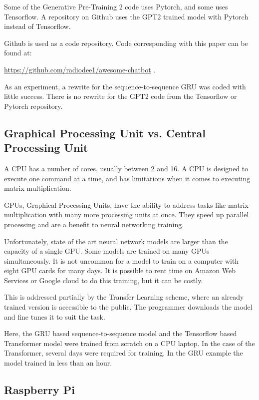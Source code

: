 Some of the Generative Pre-Training 2 code uses Pytorch, and some uses Tensorflow. A repository on Github uses the GPT2 trained model with Pytorch instead of Tensorflow.

Github is used as a code repository. Code corresponding with this paper can be found at:

\noindent\href{https://github.com/radiodee1/awesome-chatbot}{https://github.com/radiodee1/awesome-chatbot} . 

As an experiment, a rewrite for the sequence-to-sequence GRU was coded with little success. There is no rewrite for the GPT2 code from the Tensorflow or Pytorch repository.

\subsection{Graphical Processing Unit vs. Central Processing Unit}

A CPU has a number of cores, usually between 2 and 16. A CPU is designed to execute one command at a time, and has limitations when it comes to executing matrix multiplication. %

GPUs, Graphical Processing Units, have the ability to address tasks like matrix multiplication with many more processing units at once. They speed up parallel processing and are a benefit to neural networking training.%

Unfortunately, state of the art neural network models are larger than the capacity of a single GPU. Some models are trained on many GPUs simultaneously. It is not uncommon for a model to train on a computer with eight GPU cards for many days. It is possible to rent time on Amazon Web Services or Google cloud to do this training, but it can be costly.

This is addressed partially by the Transfer Learning scheme, where an already trained version is accessible to the public. The programmer downloads the model and fine tunes it to suit the task.

Here, the GRU based sequence-to-sequence model and the Tensorflow based Transformer model were trained from scratch on a CPU laptop. In the case of the Transformer, several days were required for training. In the GRU example the model trained in less than an hour.

\subsection{Raspberry Pi}

